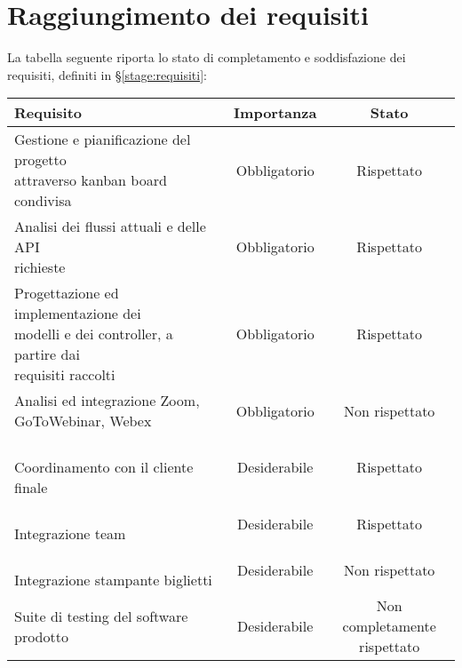 \section{Raggiungimento dei requisiti}
La tabella seguente riporta lo stato di completamento e soddisfazione dei requisiti, definiti in \S \ref{stage:requisiti}:
\begin{table}[h]
	\centering
	\label{tab:raggiungimento-obiettivi}
	\begin{tabularx}{\textwidth}{X|c|c}
		\rowcolor{white}
		\textbf{Requisito} & \textbf{Importanza} & \textbf{Stato} \\
		\hline
		\makecell[l]{Gestione e pianificazione del progetto \\ attraverso kanban board condivisa} & Obbligatorio & Rispettato \\
		\makecell[l]{Analisi dei flussi attuali e delle API \\ richieste} & Obbligatorio & Rispettato \\
		\makecell[l]{Progettazione ed implementazione dei \\ modelli e dei controller, a partire dai \\ requisiti raccolti} & Obbligatorio & Rispettato \\
		\makecell[l]{Analisi ed integrazione Zoom, \\ GoToWebinar, Webex} & Obbligatorio & Non rispettato \\
		\makecell[l]{\vspace{-6pt} \\ Coordinamento con il cliente finale \\ \vspace{-6pt}} & Desiderabile & Rispettato \\
		\makecell[l]{\vspace{-6pt} \\ Integrazione team \\ \vspace{-6pt}} & Desiderabile & Rispettato \\
		\makecell[l]{\vspace{-6pt} \\ Integrazione stampante biglietti \\ \vspace{-6pt}} & Desiderabile & Non rispettato \\
		Suite di testing del software prodotto & Desiderabile & \makecell{Non completamente \\ rispettato} \\

\end{tabularx}
\end{table}
